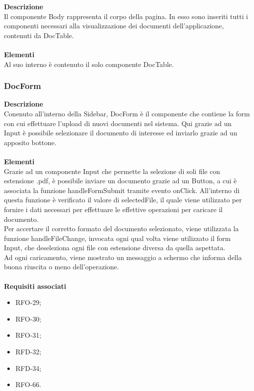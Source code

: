 \textbf{Descrizione}\\
Il componente Body rappresenta il corpo della pagina. In esso sono inseriti tutti i componenti necessari alla visualizzazione dei documenti dell'applicazione, contenuti da DocTable.\\ \\
\textbf{Elementi}\\
Al suo interno è contenuto il solo componente DocTable.

\subsubsection{DocForm}

\textbf{Descrizione}\\
Conenuto all'interno della Sidebar, DocForm è il componente che contiene la form con cui effettuare l'upload di nuovi documenti nel sistema. Qui grazie ad un Input è possibile selezionare il documento di interesse ed inviarlo grazie ad un apposito bottone.\\ \\
\textbf{Elementi}\\
Grazie ad un componente Input che permette la selezione di soli file con estensione .pdf, è possibile inviare un documento grazie ad un Button, a cui è associata la funzione handleFormSubmit tramite evento onClick. All'interno di questa funzione è verificato il valore di selectedFile, il quale viene utilizzato per fornire i dati necessari per effettuare le effettive operazioni per caricare il documento.\\
Per accertare il corretto formato del documento selezionato, viene utilizzata la funzione handleFileChange, invocata ogni qual volta viene utilizzato il form Input, che deseleziona ogni file con estensione diversa da quella aspettata.\\
Ad ogni caricamento, viene mostrato un messaggio a schermo che informa della buona riuscita o meno dell'operazione.\\ \\
\textbf{Requisiti associati}
\begin{itemize}
    \item RFO-29;
    \item RFO-30;
    \item RFO-31;
    \item RFD-32;
    \item RFD-34;
    \item RFO-66.
\end{itemize}

